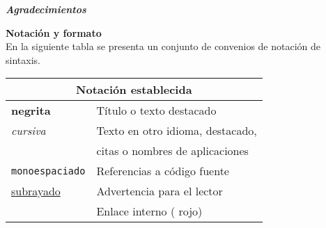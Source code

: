 


{\large \textbf{\textit{Agradecimientos}}} 
\vspace{0.5cm} \\
\lorem{}
\blankpage{}

%
%
%
%

\blankpage{}

{\large \textbf{Notación y formato}} \smallskip 
\vspace{0.5cm}\\
En la siguiente tabla se presenta un conjunto de convenios de notación de sintaxis.\smallskip 
\vspace{0.5cm}
\begin{center}
    \begin{tabular}{ll} \toprule
        \multicolumn{2}{c}{Notación establecida} \\ \midrule
        \textbf{negrita} & Título o texto destacado \\ \midrule
        \textit{cursiva} & Texto en otro idioma, destacado, \\ & citas o nombres de aplicaciones \\ \midrule
        \texttt{monoespaciado} & Referencias a código fuente \\ \midrule
        \underline{subrayado} & Advertencia para el lector \\ \midrule
        {\color{Red}{color}} &  Enlace interno ({\color{Red} rojo}) \\ \midrule
    \end{tabular}
\end{center}


